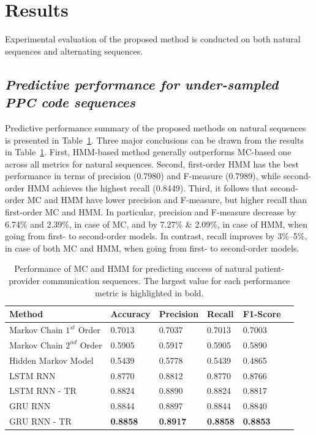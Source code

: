 \documentclass{amia_summit_2018}
\begin{document}
\section*{Results}
Experimental evaluation of the proposed method is conducted on both natural sequences and alternating sequences. 

\subsection*{\textit{Predictive performance for under-sampled PPC code sequences}}
Predictive performance summary of the proposed methods on natural sequences is presented in Table~\ref{tab:result_under_sampled}. Three major conclusions can be drawn from the results in Table~\ref{tab:result_under_sampled}. First, HMM-based method generally outperforms MC-based one across all metrics for natural sequences. Second, first-order HMM has the best performance in terms of precision (0.7980) and F-measure (0.7989), while second-order HMM achieves the highest recall (0.8449). Third,  it follows that second-order MC and HMM have lower precision and F-measure, but higher recall than first-order MC and HMM. In particular, precision and F-measure decrease by 6.74\% and 2.39\%, in case of MC, and by 7.27\% \& 2.09\%, in case of HMM, when going from first- to second-order models. In contrast, recall improves by 3\%--5\%, in case of both MC and HMM, when going from first- to second-order models. \\

\begin{table}[h]
\centering
\caption{Performance of MC and HMM for predicting success of natural patient-provider communication sequences. The largest value for each performance metric is highlighted in bold.}
\label{tab:result_under_sampled}
  \begin{tabular}{|l|l|l|l|l|l|}
  \hline
   \textbf{Method} & \textbf{Accuracy}  & \textbf{Precision}  & \textbf{Recall} & \textbf{F1-Score}\\ \hline    
    
 Markov Chain $1^{st}$ Order & 0.7013 & 0.7037 & 0.7013 & 0.7003\\ \hline
 Markov Chain $2^{nd}$ Order & 0.5905 & 0.5917 & 0.5905 & 0.5890\\ \hline
 Hidden Markov Model & 0.5439 & 0.5778 & 0.5439 & 0.4865\\ \hline
 LSTM RNN & 0.8770 & 0.8812 & 0.8770 & 0.8766\\ \hline
 LSTM RNN - TR & 0.8824 & 0.8890 & 0.8824 & 0.8817\\ \hline
 GRU RNN & 0.8844 & 0.8897 & 0.8844 & 0.8840\\ \hline
 GRU RNN - TR & \textbf{0.8858} & \textbf{0.8917} & \textbf{0.8858} & \textbf{0.8853}\\ \hline 
  \end{tabular}
\end{table} 
\end{document}
